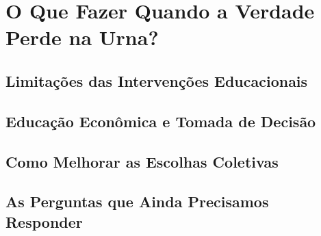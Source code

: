 

\chapter{O Que Fazer Quando a Verdade Perde na Urna?} %

\section{Limitações das Intervenções Educacionais} %



\section{Educação Econômica e Tomada de Decisão} %




\section{Como Melhorar as Escolhas Coletivas} %




\section{As Perguntas que Ainda Precisamos Responder} %



